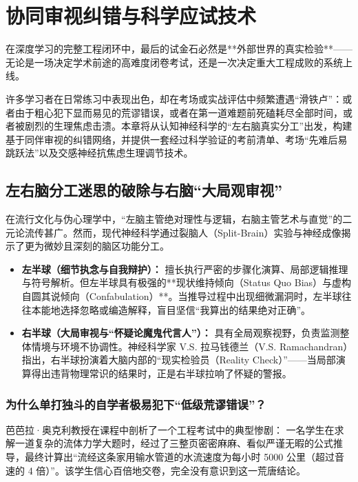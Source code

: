 \documentclass[12pt,a4paper,openany]{ctexbook}
\begin{document}
\chapter{协同审视纠错与科学应试技术}

在深度学习的完整工程闭环中，最后的试金石必然是**外部世界的真实检验**——无论是一场决定学术前途的高难度闭卷考试，还是一次决定重大工程成败的系统上线。

许多学习者在日常练习中表现出色，却在考场或实战评估中频繁遭遇“滑铁卢”：或者由于粗心犯下显而易见的荒谬错误，或者在第一道难题前死磕耗尽全部时间，或者被剧烈的生理焦虑击溃。本章将从认知神经科学的“左右脑真实分工”出发，构建基于同伴审视的纠错网络，并提供一套经过科学验证的考前清单、考场“先难后易跳跃法”以及交感神经抗焦虑生理调节技术。

\section{左右脑分工迷思的破除与右脑“大局观审视”}

在流行文化与伪心理学中，“左脑主管绝对理性与逻辑，右脑主管艺术与直觉”的二元论流传甚广。然而，现代神经科学通过裂脑人（Split-Brain）实验与神经成像揭示了更为微妙且深刻的脑区功能分工。

\begin{keypoint}[左右半球真实认知分工的神经学实相]
\begin{itemize}
    \item \textbf{左半球（细节执念与自我辩护）：} 擅长执行严密的步骤化演算、局部逻辑推理与符号解析。但左半球具有极强的**现状维持倾向（Status Quo Bias）与虚构自圆其说倾向（Confabulation）**。当推导过程中出现细微漏洞时，左半球往往本能地选择忽略或编造解释，盲目坚信“我算出的结果绝对正确”。
    \item \textbf{右半球（大局审视与“怀疑论魔鬼代言人”）：} 具有全局观察视野，负责监测整体情境与环境不协调性。神经科学家 V.S. 拉马钱德兰（V.S. Ramachandran）指出，右半球扮演着大脑内部的“现实检验员（Reality Check）”——当局部演算得出违背物理常识的结果时，正是右半球拉响了怀疑的警报。
\end{itemize}
\end{keypoint}

\subsection*{为什么单打独斗的自学者极易犯下“低级荒谬错误”？}

芭芭拉·奥克利教授在课程中剖析了一个工程考试中的典型惨剧：
一名学生在求解一道复杂的流体力学大题时，经过了三整页密密麻麻、看似严谨无暇的公式推导，最终计算出“流经这条家用输水管道的水流速度为每小时 5000 公里（超过音速的 4 倍）”。该学生信心百倍地交卷，完全没有意识到这一荒唐结论。
\end{document}
